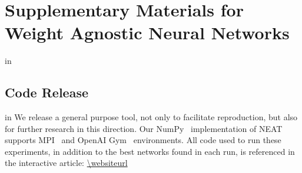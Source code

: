 \appendix








\section{Supplementary Materials for Weight Agnostic Neural Networks}
 in
\label{supplementary}

\subsection{Code Release}
 in
We release a general purpose tool, not only to facilitate reproduction, but also for further research in this direction. Our NumPy~\cite{van2011numpy} implementation of NEAT~\cite{neat} supports MPI~\cite{mpi_library} and OpenAI Gym~\cite{openai_gym} environments. All code used to run these experiments, in addition to the best networks found in each run, is referenced in the interactive article: \url{\websiteurl}


